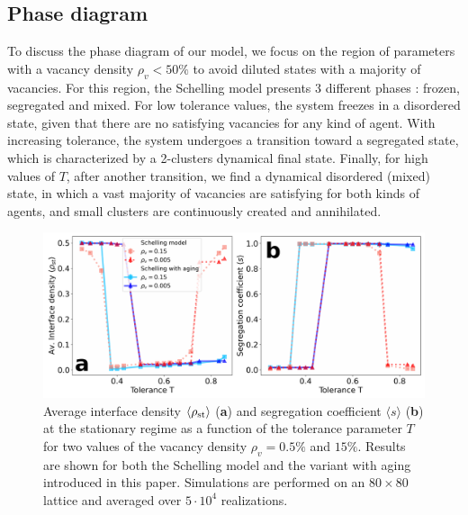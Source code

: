\subsection{Phase diagram}

To discuss the phase diagram of our model, we focus on the region of parameters with a vacancy density $\rho_v < 50 \%$ to avoid diluted states with a majority of vacancies.
For this region, the Schelling model presents 3 different phases \cite{Gauvin_2009}: frozen, segregated and mixed. For low tolerance values, the system freezes in a disordered state, given that there are no satisfying vacancies for any kind of agent. With increasing tolerance, the system undergoes a transition toward a segregated state, which is characterized by a 2-clusters dynamical final state. Finally, for high values of $T$, after another transition, we find a dynamical disordered (mixed) state, in which a vast majority of vacancies are satisfying for both kinds of agents, and small clusters are continuously created and annihilated.

\begin{figure}
\centering \captionsetup{font=sf}
\includegraphics[width=0.85\linewidth]{Figs/Aging_Schelling/fig1.pdf} 
\caption[Average interface density and segregation coefficient]{Average interface density $\langle\rho_{\rm{st}} \rangle$ (\textbf{a}) and segregation coefficient $\langle s \rangle$ (\textbf{b}) at the stationary regime as a function of the tolerance parameter $T$ for two values of the vacancy density $\rho_{v} = 0.5\%$ and $15\%$. Results are shown for both the Schelling model and the variant with aging introduced in this paper. Simulations are performed on an $80\times 80$ lattice and averaged over $5 \cdot 10^{4}$ realizations.}
\label{Fig1}
\end{figure}

